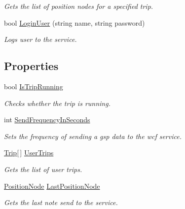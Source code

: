 \begin{DoxyCompactItemize}
\begin{DoxyCompactList}\small\item\em Gets the list of position nodes for a specified trip. \item\end{DoxyCompactList}\item 
bool \hyperlink{class_tripi_1_1wcf_1_1_service_manager_a49ddf47f12c142164c1390eb247bbf70}{LoginUser} (string name, string password)
\begin{DoxyCompactList}\small\item\em Logs user to the service. \item\end{DoxyCompactList}\end{DoxyCompactItemize}
\subsection*{Properties}
\begin{DoxyCompactItemize}
\item 
bool \hyperlink{class_tripi_1_1wcf_1_1_service_manager_ab41e53f9ef7bd367f2b07a21be60b069}{IsTripRunning}
\begin{DoxyCompactList}\small\item\em Checks whether the trip is running. \item\end{DoxyCompactList}\item 
int \hyperlink{class_tripi_1_1wcf_1_1_service_manager_afa562f56d741a45b14d83b6acb1f1c66}{SendFrequencyInSeconds}
\begin{DoxyCompactList}\small\item\em Sets the frequency of sending a gsp data to the wcf service. \item\end{DoxyCompactList}\item 
\hyperlink{class_trip}{Trip}\mbox{[}$\,$\mbox{]} \hyperlink{class_tripi_1_1wcf_1_1_service_manager_aa00ae9a25006f981fedf1fac417798e2}{UserTrips}
\begin{DoxyCompactList}\small\item\em Gets the list of user trips. \item\end{DoxyCompactList}\item 
\hyperlink{class_position_node}{PositionNode} \hyperlink{class_tripi_1_1wcf_1_1_service_manager_a239da270c1ca481e3819a50a13060438}{LastPositionNode}
\begin{DoxyCompactList}\small\item\em Gets the last note send to the service. \item\end{DoxyCompactList}\end{DoxyCompactItemize}
